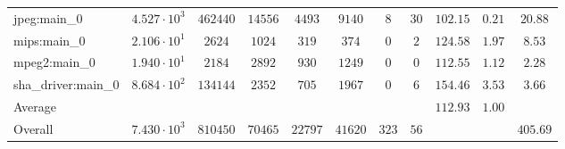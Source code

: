 \begin{tabular}{|l|c|c|c|c|c|c|c|c|c|c|}
jpeg:main\_0            & $ 4.527 \cdot 10^{3}  $ & $ 462440 $ & $ 14556 $ & $ 4493  $ & $ 9140  $ & $ 8   $ & $ 30 $ & $ 102.15      $ & $ 0.21    $ & $ 20.88   $ \\
mips:main\_0            & $ 2.106 \cdot 10^{1}  $ & $ 2624   $ & $ 1024  $ & $ 319   $ & $ 374   $ & $ 0   $ & $ 2  $ & $ 124.58      $ & $ 1.97    $ & $ 8.53    $ \\
mpeg2:main\_0           & $ 1.940 \cdot 10^{1}  $ & $ 2184   $ & $ 2892  $ & $ 930   $ & $ 1249  $ & $ 0   $ & $ 0  $ & $ 112.55      $ & $ 1.12    $ & $ 2.28    $ \\
sha\_driver:main\_0     & $ 8.684 \cdot 10^{2}  $ & $ 134144 $ & $ 2352  $ & $ 705   $ & $ 1967  $ & $ 0   $ & $ 6  $ & $ 154.46      $ & $ 3.53    $ & $ 3.66    $ \\
\hline
Average                 & $                     $ & $        $ & $       $ & $       $ & $       $ & $     $ & $    $ & $ 112.93      $ & $ 1.00    $ & $         $ \\
\hline
Overall                 & $ 7.430 \cdot 10^{3}  $ & $ 810450 $ & $ 70465 $ & $ 22797 $ & $ 41620 $ & $ 323 $ & $ 56 $ & $             $ & $         $ & $ 405.69  $ \\
\hline
\end{tabular}
